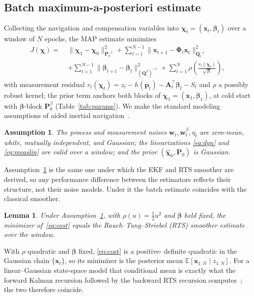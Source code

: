 \documentclass{IEEEtaes}
\newtheorem{lemma}{Lemma}
\newtheorem{assumption}{Assumption}
\begin{document}
\subsection{Batch maximum-a-posteriori estimate}
Collecting the navigation and compensation variables into
$\boldsymbol{\chi}_t=(\mathbf{x}_t,\boldsymbol{\beta}_t)$ over a window of $N$
epochs, the MAP estimate minimizes
\begin{equation}
\begin{aligned}
J(\boldsymbol{\chi})=\;&\lVert\boldsymbol{\chi}_1-\boldsymbol{\chi}_0\rVert^2_{\mathbf{P}_0^{-1}}
+\sum_{t=1}^{N-1}\lVert\mathbf{x}_{t+1}-\boldsymbol{\Phi}_t\mathbf{x}_t\rVert^2_{\mathbf{Q}_t^{-1}}\\
&+\sum_{t=1}^{N-1}\lVert\boldsymbol{\beta}_{t+1}-\boldsymbol{\beta}_t\rVert^2_{(\mathbf{Q}^{\beta})^{-1}}
+\sum_{t=1}^{N}\rho\!\left(\frac{r_t(\boldsymbol{\chi}_t)}{\sqrt{R}}\right),
\end{aligned}
\label{eq:cost}
\end{equation}
with measurement residual $r_t(\boldsymbol{\chi}_t)=z_t-h(\mathbf{p}_t)-
\mathbf{A}_t^{\top}\boldsymbol{\beta}_t-S_t$ and $\rho$ a possibly robust kernel;
the prior term anchors both blocks of $\boldsymbol{\chi}_1=(\mathbf{x}_1,
\boldsymbol{\beta}_1)$, at cold start with $\boldsymbol{\beta}$-block
$\mathbf{P}_0^{\beta}$ (Table~\ref{tab:params}).
We make the standard modeling assumptions of aided inertial
navigation~\cite{groves2013,barshalom2001}.
\begin{assumption}\label{as:model}
The process and measurement noises $\mathbf{w}_t,\mathbf{w}^{\beta}_t,\eta_t$ are
zero-mean, white, mutually independent, and Gaussian; the linearizations
\eqref{eq:dyn} and \eqref{eq:measlin} are valid over a window; and the prior
$(\hat{\boldsymbol{\chi}}_0,\mathbf{P}_0)$ is Gaussian.
\end{assumption}
Assumption~\ref{as:model} is the same one under which the EKF and RTS smoother are
derived, so any performance difference between the estimators reflects their
structure, not their noise models. Under it the batch estimate coincides with
the classical smoother.

\begin{lemma}\label{lem:rts}
Under Assumption~\ref{as:model}, with $\rho(u)=\tfrac12u^2$ and $\boldsymbol{\beta}$
held fixed, the minimizer of~\eqref{eq:cost} equals the Rauch--Tung--Striebel (RTS)
smoother estimate over the window.
\end{lemma}
\begin{IEEEproof}
With $\rho$ quadratic and $\boldsymbol{\beta}$ fixed, \eqref{eq:cost} is a positive-%
definite quadratic in the Gaussian chain $\{\mathbf{x}_t\}$, so its minimizer is the
posterior mean $\mathbb{E}[\mathbf{x}_{1:N}\mid z_{1:N}]$. For a linear--Gaussian
state-space model that conditional mean is exactly what the forward Kalman recursion
followed by the backward RTS recursion computes~\cite{rauch1965}; the two therefore
coincide. \end{IEEEproof}
\end{document}
